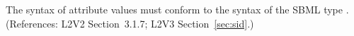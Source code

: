The syntax of  attribute values must conform to the syntax of the
SBML type .  (References: L2V2 Section~3.1.7;
L2V3 Section~\ref{sec:sid}.)
